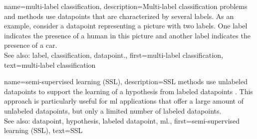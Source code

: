 {name={multi-label classification}, 
	description={Multi-\gls{label} 
		\gls{classification} problems and methods use \glspl{datapoint} 
		that are characterized by several \glspl{label}. As an example, consider a \gls{datapoint} 
		representing a picture with two \glspl{label}. One \gls{label} indicates the presence of a human 
		in this picture and another \gls{label} indicates the presence of a car.
				\\
		See also: \gls{label}, \gls{classification}, \gls{datapoint}.},
	    first={multi-label classification},
	    text={multi-label classification} 
}


{name={semi-supervised learning (SSL)}, 
	description={SSL methods use unlabeled \glspl{datapoint}
		to support the learning of a \gls{hypothesis} from \glspl{labeled datapoint} \cite{SemiSupervisedBook}. 
		This approach is particularly useful for \gls{ml} applications that offer a large amount of 
		unlabeled \glspl{datapoint}, but only a limited number of \glspl{labeled datapoint}.
			\\
		See also: \gls{datapoint}, \gls{hypothesis}, \gls{labeled datapoint}, \gls{ml}.}, 
	first={semi-supervised learning (SSL)},
	text={SSL} 
}
	
